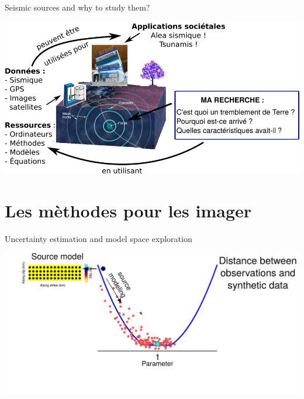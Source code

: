 \documentclass{beamer}
\begin{document}
\begin{frame}{Seismic sources and why to study them?}

    \begin{center}
        \vskip -0.3cm \includegraphics[width=1\linewidth]{images/earthquake_whys_whats_3-1} \\     
    \end{center}
    \addtocounter{framenumber}{-1}
    
\end{frame}


\section{Les mèthodes pour les imager}

\begin{frame}
 {Uncertainty estimation and model space exploration}

 \includegraphics[width=1\linewidth]{images/uncertainty_1.pdf}
 
\end{frame}
\end{document}
